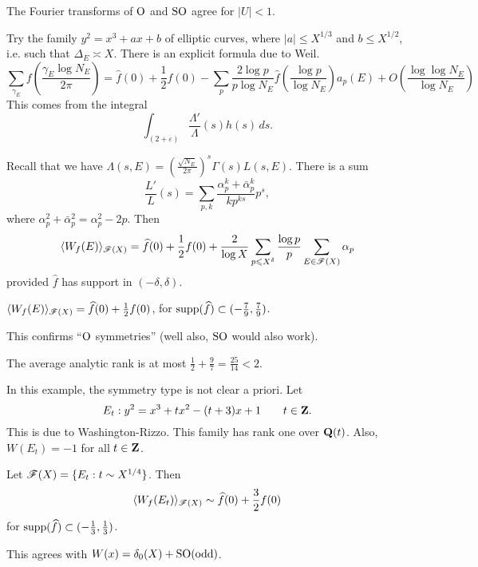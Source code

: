 The Fourier transforms of $\operatorname{O}$ and $\operatorname{SO}$ agree for 
$|U|<1$. 

Try the family $y^2=x^3+a x+b$ of elliptic curves, where 
$|a|\leq X^{1/3}$ and $b\leq X^{1/2}$, i.e. such that 
$\Delta_E\asymp X$. There is an explicit formula due to Weil. 
\[
  \sum_{\gamma_E} f\left(\frac{\gamma_E\log N_E}{2\pi}\right) = \hat f(0)+\frac 1 2 f(0) - \sum_p \frac{2\log p}{p\log N_E} \hat f\left(\frac{\log p}{\log N_E}\right) a_p(E) + O\left(\frac{\log\log N_E}{\log N_E}\right)
\]
This comes from the integral 
\[
  \int_{(2+\varepsilon)} \frac{\Lambda'}{\Lambda}(s)  h(s)\, ds .
\]

Recall that we have 
$\Lambda(s,E) = \left(\frac{\sqrt{N_E}}{2\pi}\right)^s \Gamma(s) L(s,E)$. 
There is a sum 
\[
  \frac{L'}{L}(s) = \sum_{p,k} \frac{\alpha_p^k + \bar\alpha_p^k}{k p^{k s}} p^s ,
\]
where $\alpha_p^2 + \bar\alpha_p^2 = \alpha_p^2 - 2 p$. Then 
\[
  \langle W_f(E)\rangle_{\mathscr{F}(X)} = \widehat f(0) + \frac 1 2 f(0) + \frac{2}{\log X}\sum_{p\leqslant X^\delta} \frac{\log p}{p} \sum_{E\in \mathscr{F}(X)} \alpha_p 
\]
provided $\hat f$ has support in $(-\delta,\delta)$. 

\begin{theorem}[Young]
$\langle W_f(E)\rangle_{\mathscr{F}(X)} = \widehat f(0)+\frac 1 2 f(0)$, for 
$\operatorname{supp}(\widehat f)\subset (-\frac 7 9, \frac 7 9)$. 
\end{theorem}

This confirms ``$\operatorname{O}$ symmetries'' (well also, 
$\operatorname{SO}$ would also work). 

\begin{corollary}
The average analytic rank is at most $\frac 1 2+\frac 9 7=\frac{25}{14}<2$. 
\end{corollary}

\begin{example}
In this example, the symmetry type is not clear a priori. Let 
\[
  E_t:y^2=x^3+t x^2-(t+3) x+ 1 \qquad t\in \mathbf{Z} .
\]
This is due to Washington-Rizzo. This family has rank one over $\mathbf{Q}(t)$. 
Also, $W(E_t) = -1$ for all $t\in \mathbf{Z}$. 
\end{example}

\begin{theorem}[Miller]
Let $\mathscr{F}(X)=\{E_t:t\sim X^{1/4}\}$. Then 
\[
  \langle W_f(E_t)\rangle_{\mathscr{F}(X)} \sim \widehat f(0) + \frac 3 2 f(0) 
\]
for $\operatorname{supp}(\widehat f)\subset (-\frac 1 3,\frac 1 3)$. 
\end{theorem}
This agrees with $W(x) = \delta_0(X)+\operatorname{SO}(\text{odd})$. 

